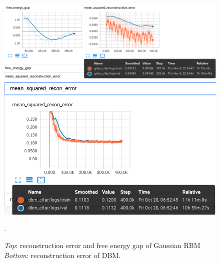 \clearpage
\begin{figure}[h]
\begin{mdframed}
\centering
\includegraphics[width=6.4in]{dbm-cifar-latest/grbm_metrics.png}
\\[6em]
\includegraphics[width=6in]{dbm-cifar-latest/dbm_msre.png}
\caption{\emph{Top}: reconstruction error and free energy gap of Gaussian RBM \emph{Bottom}: reconstruction error of DBM.}.
\end{mdframed}
\end{figure}
